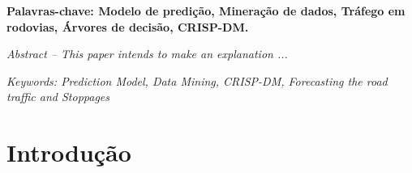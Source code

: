 \documentclass[conference,compsoc]{IEEEtran}
\begin{document}
\vspace{0.1cm}

\textbf{Palavras-chave: Modelo de predição, Mineração de dados, Tráfego em rodovias, Árvores de decisão, CRISP-DM.}


\vspace{0.1cm}

\textit{Abstract -- This paper intends to make an explanation ...}

\textit{Keywords: Prediction Model, Data Mining, CRISP-DM, Forecasting the road traffic and Stoppages}




%
\IEEEpeerreviewmaketitle



\section{Introdução}
\end{document}
